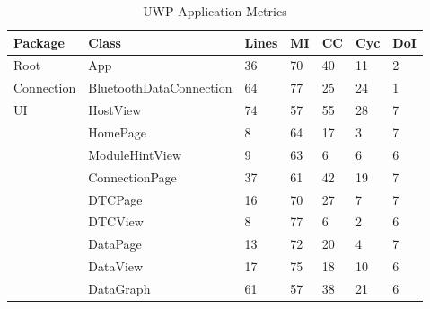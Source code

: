 {{\begin{table}[ht]
\begin{scriptsize}
\begin{center}
\begin{tabularx}{\textwidth}{| l | X | l | l | l | l | l |}
				\hline
				\textbf{Package} & \textbf{Class} & \textbf{Lines} & \textbf{MI} & \textbf{CC} & \textbf{Cyc} & \textbf{DoI}\\
				\hline				
				Root & App & 36 & 70 & 40 & 11 & 2\\
				\hline
				Connection & BluetoothDataConnection & 64 & 77 & 25 & 24 & 1\\
				\hline
				\multirow{9}{*}{UI} & HostView & 74 & 57 & 55 & 28 & 7\\\cline{2-7}
									& HomePage & 8 & 64 & 17 & 3 & 7\\\cline{2-7}
									& ModuleHintView & 9 & 63 & 6 & 6 & 6\\\cline{2-7}
									& ConnectionPage & 37 & 61 & 42 & 19 & 7\\\cline{2-7}
									& DTCPage & 16 & 70 & 27 & 7 & 7\\\cline{2-7}
									& DTCView & 8 & 77 & 6 & 2 & 6\\\cline{2-7}
									& DataPage & 13 & 72 & 20 & 4 & 7\\\cline{2-7}
									& DataView & 17 & 75 & 18 & 10 & 6\\\cline{2-7}
									& DataGraph & 61 & 57 & 38 & 21 & 6\\\cline{2-7}
				\hline
				\end{tabularx}
				\caption{UWP Application Metrics}
				\label{tab:UWPApp}
			\end{center}
		\end{scriptsize}
		\end{table}		
		
		\begin{table}[ht]
		\begin{scriptsize}			
			\begin{center}				
				\begin{tabularx}{\textwidth}{| l | X | l | l | l | l | l |}
								

\end{tabularx}
\end{center}
\end{scriptsize}
\end{table}}}
